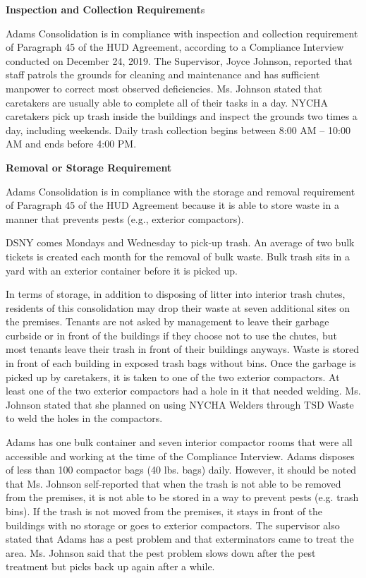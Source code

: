 
\textbf{Inspection and Collection Requirement}s

Adams Consolidation is in compliance with inspection and collection requirement of Paragraph 45 of the HUD Agreement, according to a Compliance Interview conducted on December 24, 2019. The Supervisor, Joyce Johnson, reported that staff patrols the grounds for cleaning and maintenance and has sufficient manpower to correct most observed deficiencies. Ms. Johnson stated that caretakers are usually able to complete all of their tasks in a day. NYCHA caretakers pick up trash inside the buildings and inspect the grounds two times a day, including weekends. Daily trash collection begins between 8:00 AM -- 10:00 AM and ends before 4:00 PM. 



\textbf{Removal or Storage Requirement}

Adams Consolidation is in compliance with the storage and removal requirement of Paragraph 45 of the HUD Agreement because it is able to store waste in a manner that prevents pests (e.g., exterior compactors).

DSNY comes Mondays and Wednesday to pick-up trash. An average of two bulk tickets is created each month for the removal of bulk waste. Bulk trash sits in a yard with an exterior container before it is picked up. 



In terms of storage, in addition to disposing of litter into interior trash chutes, residents of this consolidation may drop their waste at seven additional sites on the premises. Tenants are not asked by management to leave their garbage curbside or in front of the buildings if they choose not to use the chutes, but most tenants leave their trash in front of their buildings anyways. Waste is stored in front of each building in exposed trash bags without bins. Once the garbage is picked up by caretakers, it is taken to one of the two exterior compactors. At least one of the two exterior compactors had a hole in it that needed welding. Ms. Johnson stated that she planned on using NYCHA Welders through TSD Waste to weld the holes in the compactors.



Adams has one bulk container and seven interior compactor rooms that were all accessible and working at the time of the Compliance Interview. Adams disposes of less than 100 compactor bags (40 lbs. bags) daily. However, it should be noted that Ms. Johnson self-reported that when the trash is not able to be removed from the premises, it is not able to be stored in a way to prevent pests (e.g. trash bins). If the trash is not moved from the premises, it stays in front of the buildings with no storage or goes to exterior compactors. The supervisor also stated that Adams has a pest problem and that exterminators came to treat the area. Ms. Johnson said that the pest problem slows down after the pest treatment but picks back up again after a while.



